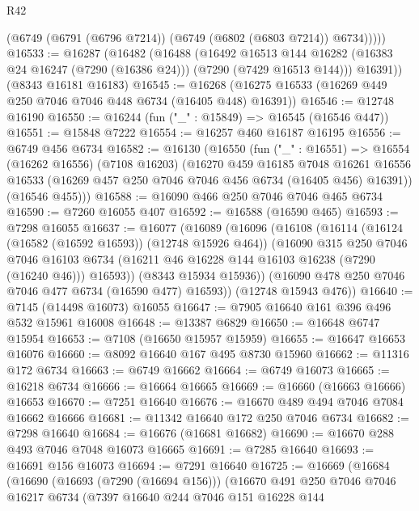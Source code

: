 \begin{lexlean}{R42}
\begin{coremodule}
{          (@6749 (@6791 (@6796 @7214)) (@6749 (@6802 (@6803 @7214)) @6734)))))
@16533 := @16287
    (@16482
      (@16488
        (@16492
          @16513
          @144
          @16282
          (@16383 @24 @16247 (@7290 (@16386 @24)))
          (@7290 (@7429 @16513 @144)))
        @16391))
    (@8343 @16181 @16183)
@16545 := @16268 (@16275 @16533 (@16269 @449 @250 @7046 @7046 @448 @6734 (@16405 @448) @16391))
@16546 := @12748 @16190
@16550 := @16244 (fun ("_" : @15849) => @16545 (@16546 @447))
@16551 := @15848 @7222
@16554 := @16257 @460 @16187 @16195
@16556 := @6749 @456 @6734
@16582 := @16130
    (@16550
      (fun ("_" : @16551) =>
      @16554
        (@16262 @16556)
        (@7108 @16203)
        (@16270
          @459
          @16185
          @7048
          @16261
          @16556
          @16533
          (@16269 @457 @250 @7046 @7046 @456 @6734 (@16405 @456) @16391))
        (@16546 @455)))
@16588 := @16090 @466 @250 @7046 @7046 @465 @6734
@16590 := @7260 @16055 @407
@16592 := @16588 (@16590 @465)
@16593 := @7298 @16055
@16637 := @16077
    (@16089
      (@16096
        (@16108
          (@16114
            (@16124 (@16582 (@16592 @16593)) (@12748 @15926 @464))
            (@16090
              @315
              @250
              @7046
              @7046
              @16103
              @6734
              (@16211 @46 @16228 @144 @16103 @16238 (@7290 (@16240 @46)))
              @16593))
          (@8343 @15934 @15936))
        (@16090 @478 @250 @7046 @7046 @477 @6734 (@16590 @477) @16593))
      (@12748 @15943 @476))
@16640 := @7145 (@14498 @16073) @16055
@16647 := @7905 @16640 @161 @396 @496 @532 @15961 @16008
@16648 := @13387 @6829
@16650 := @16648 @6747 @15954
@16653 := @7108 (@16650 @15957 @15959)
@16655 := @16647 @16653 @16076
@16660 := @8092 @16640 @167 @495 @8730 @15960
@16662 := @11316 @172 @6734
@16663 := @6749 @16662
@16664 := @6749 @16073
@16665 := @16218 @6734
@16666 := @16664 @16665
@16669 := @16660 (@16663 @16666) @16653
@16670 := @7251 @16640
@16676 := @16670 @489 @494 @7046 @7084 @16662 @16666
@16681 := @11342 @16640 @172 @250 @7046 @6734
@16682 := @7298 @16640
@16684 := @16676 (@16681 @16682)
@16690 := @16670 @288 @493 @7046 @7048 @16073 @16665
@16691 := @7285 @16640
@16693 := @16691 @156 @16073
@16694 := @7291 @16640
@16725 := @16669
    (@16684
      (@16690
        (@16693 (@7290 (@16694 @156)))
        (@16670
          @491
          @250
          @7046
          @7046
          @16217
          @6734
          (@7397
            @16640
            @244
            @7046
            @151
            @16228
            @144
}
\end{coremodule}
\end{lexlean}
